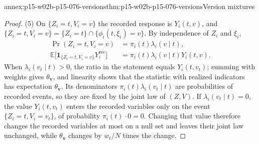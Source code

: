 \begin{annexitem}{annex:p15-w02b-p15-076-versions}{thm:p15-w02b-p15-076-versions}{Version mixtures}
\begin{proof}
(5) On \(\{Z_i=t,V_i=v\}\) the recorded response is \(Y_i(t,v)\), and
\(\{Z_i=t,V_i=v\}=\{Z_i=t\}\cap\{\phi_i(t,\xi_i)=v\}\). By independence of
\(Z_i\) and \(\xi_i\),
\[
 \begin{aligned}
 \Pr(Z_i=t,V_i=v)&=\pi_i(t)\lambda_i(v\mid t),\\
 \mathbb E\bigl[\mathbf 1_{\{Z_i=t,V_i=v\}}Y_i^{\mathrm{rec}}\bigr]
  &=\pi_i(t)\lambda_i(v\mid t)Y_i(t,v).
 \end{aligned}
\]
When \(\lambda_i(v_t\mid t)>0\), the ratio in the statement equals
\(Y_i(t,v_t)\); summing with weights gives \(\theta_{\mathbf v}\), and
linearity shows that the statistic with realized indicators has
expectation \(\theta_{\mathbf v}\). Its denominators
\(\pi_i(t)\lambda_i(v_t\mid t)\) are probabilities of recorded events, so
they are fixed by the joint law of \((Z,V)\). If
\(\lambda_i(v_t\mid t)=0\), the value \(Y_i(t,v_t)\) enters the recorded
variables only on the event \(\{Z_i=t,V_i=v_t\}\), of probability
\(\pi_i(t)\cdot0=0\). Changing that value therefore changes the recorded
variables at most on a null set and leaves their joint law unchanged, while
\(\theta_{\mathbf v}\) changes by \(w_t/N\) times the change.
\end{proof}
\end{annexitem}

